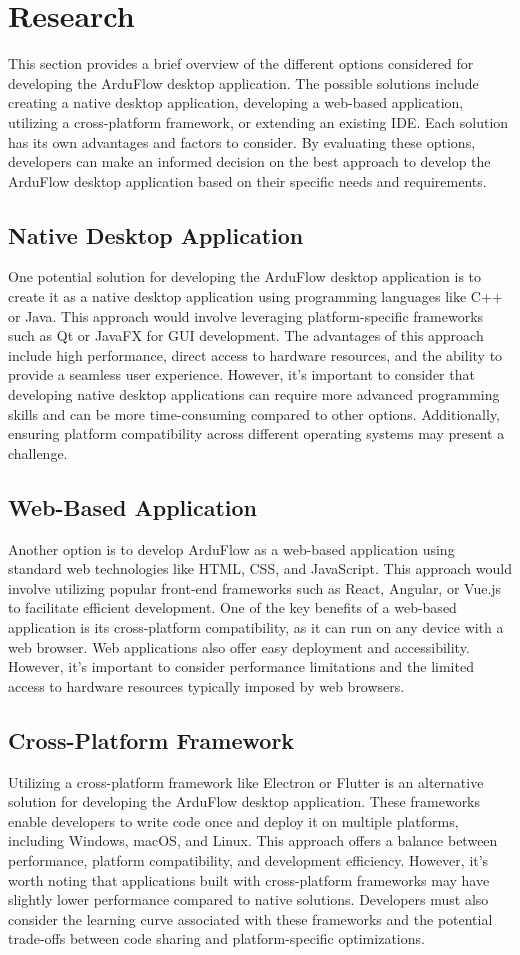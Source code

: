 \documentclass[a4paper, 11pt]{article}
\begin{document}
\section{Research}
This section provides a brief overview of the different options considered for developing the ArduFlow desktop application. The possible solutions include creating a native desktop application, developing a web-based application, utilizing a cross-platform framework, or extending an existing IDE. Each solution has its own advantages and factors to consider. By evaluating these options, developers can make an informed decision on the best approach to develop the ArduFlow desktop application based on their specific needs and requirements.

\subsection{Native Desktop Application}
One potential solution for developing the ArduFlow desktop application is to create it as a native desktop application using programming languages like C++ or Java. This approach would involve leveraging platform-specific frameworks such as Qt or JavaFX for GUI development. The advantages of this approach include high performance, direct access to hardware resources, and the ability to provide a seamless user experience. However, it's important to consider that developing native desktop applications can require more advanced programming skills and can be more time-consuming compared to other options. Additionally, ensuring platform compatibility across different operating systems may present a challenge.
\subsection{Web-Based Application}
Another option is to develop ArduFlow as a web-based application using standard web technologies like HTML, CSS, and JavaScript. This approach would involve utilizing popular front-end frameworks such as React, Angular, or Vue.js to facilitate efficient development. One of the key benefits of a web-based application is its cross-platform compatibility, as it can run on any device with a web browser. Web applications also offer easy deployment and accessibility. However, it's important to consider performance limitations and the limited access to hardware resources typically imposed by web browsers.
\subsection{Cross-Platform Framework}
Utilizing a cross-platform framework like Electron or Flutter is an alternative solution for developing the ArduFlow desktop application. These frameworks enable developers to write code once and deploy it on multiple platforms, including Windows, macOS, and Linux. This approach offers a balance between performance, platform compatibility, and development efficiency. However, it's worth noting that applications built with cross-platform frameworks may have slightly lower performance compared to native solutions. Developers must also consider the learning curve associated with these frameworks and the potential trade-offs between code sharing and platform-specific optimizations.
\end{document}
